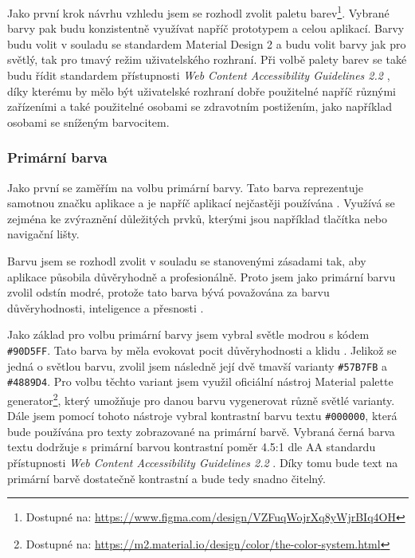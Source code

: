 Jako první krok návrhu vzhledu jsem se rozhodl zvolit paletu barev\footnote{Dostupné na: \href{https://www.figma.com/design/VZFuqWojrXq8yWjrBIq4OH}{https://www.figma.com/design/VZFuqWojrXq8yWjrBIq4OH}}. Vybrané barvy pak budu konzistentně využívat napříč prototypem a celou aplikací. Barvy budu volit v souladu se standardem Material Design 2 a budu volit barvy jak pro světlý, tak pro tmavý režim uživatelského rozhraní. Při volbě palety barev se také budu řídit standardem přístupnosti \textit{Web Content Accessibility Guidelines 2.2} \cite{WCAG22}, díky kterému by mělo být uživatelské rozhraní dobře použitelné napříč různými zařízeními a také použitelné osobami se zdravotním postižením, jako například osobami se sníženým barvocitem.

\subsubsection{Primární barva}

Jako první se zaměřím na volbu primární barvy. Tato barva reprezentuje samotnou značku aplikace a je napříč aplikací nejčastěji používána \cite{MaterialDesignColorSystem}. Využívá se zejména ke zvýraznění důležitých prvků, kterými jsou například tlačítka nebo navigační lišty.

Barvu jsem se rozhodl zvolit v souladu se stanovenými zásadami tak, aby aplikace působila důvěryhodně a profesionálně. Proto jsem jako primární barvu zvolil odstín modré, protože tato barva bývá považována za barvu důvěryhodnosti, inteligence a přesnosti \cite{NURColors}.

Jako základ pro volbu primární barvy jsem vybral světle modrou s kódem \texttt{\#90D5FF}. Tato barva by měla evokovat pocit důvěryhodnosti a klidu \cite{FigmaLightBlue}. Jelikož se jedná o světlou barvu, zvolil jsem následně její dvě tmavší varianty \texttt{\#57B7FB} a \texttt{\#4889D4}. Pro volbu těchto variant jsem využil oficiální nástroj Material palette generator\footnote{Dostupné na: \href{https://m2.material.io/design/color/the-color-system.html}{https://m2.material.io/design/color/the-color-system.html}}, který umožňuje pro danou barvu vygenerovat různě světlé varianty. Dále jsem pomocí tohoto nástroje vybral kontrastní barvu textu \texttt{\#000000}, která bude používána pro texty zobrazované na primární barvě. Vybraná černá barva textu dodržuje s primární barvou kontrastní poměr 4.5:1 dle AA standardu přístupnosti \textit{Web Content Accessibility Guidelines 2.2} \cite{WCAG22}. Díky tomu bude text na primární barvě dostatečně kontrastní a bude tedy snadno čitelný.

